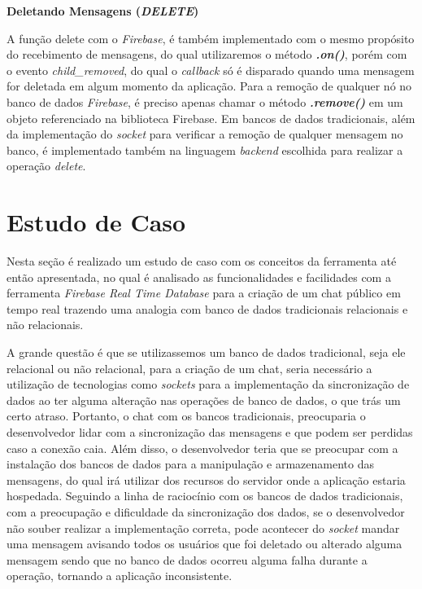 \documentclass[12pt]{article}
\begin{document}
\textbf{Deletando Mensagens (\textit{DELETE})}

A função delete com o \textit{Firebase}, é também implementado com o mesmo propósito do recebimento de mensagens, do qual utilizaremos o método \textit{\textbf{.on()}}, porém com o evento \textit{child\_removed}, do qual o \textit{callback} só é disparado quando uma mensagem for deletada em algum momento da aplicação. Para a remoção de qualquer nó no banco de dados \textit{Firebase}, é preciso apenas chamar o método \textit{\textbf{.remove()}} em um objeto referenciado na biblioteca Firebase. Em bancos de dados tradicionais, além da implementação do \textit{socket} para verificar a remoção de qualquer mensagem no banco, é implementado também na linguagem \textit{backend} escolhida para realizar a operação \textit{delete}.

\section{Estudo de Caso}

Nesta seção é realizado um estudo de caso com os conceitos da ferramenta até então apresentada, no qual é analisado as funcionalidades e facilidades com a ferramenta \textit{Firebase Real Time Database} para a criação de um chat público em tempo real trazendo uma analogia com banco de dados tradicionais relacionais e não relacionais.

A grande questão é que se utilizassemos um banco de dados tradicional, seja ele relacional ou não relacional, para a criação de um chat, seria necessário a utilização de tecnologias como \textit{sockets} para a implementação da sincronização de dados ao ter alguma alteração nas operações de banco de dados, o que trás um certo atraso. Portanto, o chat com os bancos tradicionais, preocuparia o desenvolvedor lidar com a sincronização das mensagens e que podem ser perdidas caso a conexão caia. Além disso, o desenvolvedor teria que se preocupar com a instalação dos bancos de dados para a manipulação e armazenamento das mensagens, do qual irá utilizar dos recursos do servidor onde a aplicação estaria hospedada. Seguindo a linha de raciocínio com os bancos de dados tradicionais, com a preocupação e dificuldade da sincronização dos dados, se o desenvolvedor não souber realizar a implementação correta, pode acontecer do \textit{socket} mandar uma mensagem avisando todos os usuários que foi deletado ou alterado alguma mensagem sendo que no banco de dados ocorreu alguma falha durante a operação, tornando a aplicação inconsistente.
\end{document}
